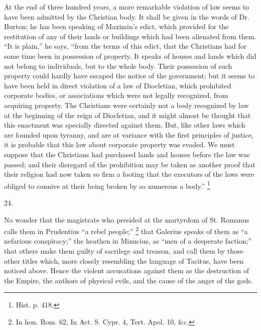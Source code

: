At the end of three hundred years, a more remarkable
violation of law seems to have been admitted by the
Christian body. It shall be given in the words of Dr.
Burton; he has been speaking of Maximin's edict, which
provided for the restitution of any of their lands or
buildings which had been alienated from them. ``It is
plain,'' he says, ``from the terms of this edict,
that the Christians had for some time been in possession
of property. It speaks of houses and lands which did not
belong to individuals, but to the whole body. Their
possession of such property could hardly have escaped the
notice of the government; but it seems to have been held
in direct violation of a law of Diocletian, which
prohibited corporate bodies, or associations which were
not legally recognized, from acquiring property. The
Christians were certainly not a body recognized by law at
the beginning of the reign of Diocletian, and it might
almost be thought that this enactment was specially
directed against them. But, like other laws which are
founded upon tyranny, and are at variance with the first
principles of justice, it is probable that this law about
corporate property was evaded. We must suppose that the
Christians had purchased lands and houses before the law
was passed; and their disregard of the prohibition may be
taken as another proof that their religion had now taken
so firm a footing that the executors of the laws were
obliged to connive at their being broken by so numerous a
body.'' \footnote{Hist. p. 418.}

24.

No wonder that the magistrate who presided at the
martyrdom of St. Romanus calls them in Prudentius ``a
rebel people;'' \footnote{In hon. Rom. 62, In Act. S.
Cypr. 4, Tert. Apol. 10, \&c.} that Galerius speaks of them
as ``a nefarious conspiracy;'' the heathen in
Minucius, as ``men of a desperate faction;'' that
others make them guilty of sacrilege and treason, and
call them by those other titles which, more closely
resembling the language of Tacitus, have been noticed
above. Hence the violent accusations against them as the
destruction of the Empire, the authors of physical evils,
and the cause of the anger of the gods.

